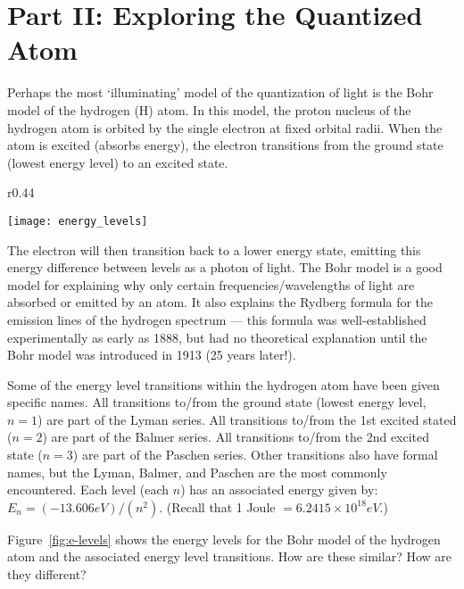 \section*{Part II: Exploring the Quantized Atom}
%
Perhaps the most `illuminating' model of the quantization of light is the Bohr model of the hydrogen (H) atom. 
In this model, the proton nucleus of the hydrogen atom is orbited by the single electron at fixed orbital radii. 
When the atom is excited (absorbs energy), the electron transitions from the ground state (lowest energy level) to an excited state. 
\begin{wrapfigure}{r}{0.44\textwidth}
  \vspace{-15pt}  
  \begin{center}
    \texttt{[image: energy\_levels]}
  \end{center}
  \vspace{-20pt}
  \caption{Energy level transitions for the Bohr Model of the hydrogen atom.}
  \label{fig:e-levels}
  \vspace{-10pt}
\end{wrapfigure}
The electron will then transition back to a lower energy state, emitting this energy difference between levels as a photon of light. 
The Bohr model is a good model for explaining why only certain frequencies/wavelengths of light are absorbed or emitted by an atom. 
It also explains the Rydberg formula for the emission lines of the hydrogen spectrum — this formula was well-established experimentally as early as 1888, but had no theoretical explanation until the Bohr model was introduced in 1913 (25 years later!). 
\par 
Some of the energy level transitions within the hydrogen atom have been given specific names. 
All transitions to/from the ground state (lowest energy level, $n = 1$) are part of the Lyman series. 
All transitions to/from the 1st excited stated ($n = 2$) are part of the Balmer series. 
All transitions to/from the 2nd excited state ($n = 3$) are part of the Paschen series. 
Other transitions also have formal names, but the Lyman, Balmer, and Paschen are the most commonly encountered. 
Each level (each $n$) has an associated energy given by: $E_{n}=(-13.606 eV)/(n^{2})$. 
(Recall that 1 Joule $= 6.2415 \times 10^{18} eV$.) 
\par 
Figure~\ref{fig:e-levels} shows the energy levels for the Bohr model of the hydrogen atom and the associated energy level transitions. 
How are these similar? 
How are they different? 
